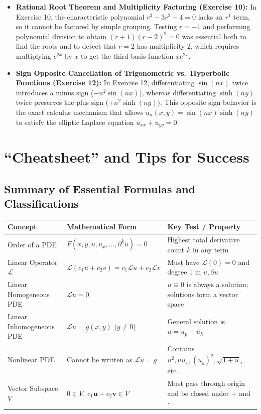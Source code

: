 \documentclass[11pt,a4paper]{article}
\begin{document}
\begin{itemize}
    \item \textbf{Rational Root Theorem and Multiplicity Factoring (Exercise 10):}
    In Exercise 10, the characteristic polynomial $r^3 - 3r^2 + 4 = 0$ lacks an $r^1$ term, so it cannot be factored by simple grouping. Testing $r = -1$ and performing polynomial division to obtain $(r+1)(r-2)^2 = 0$ was essential both to find the roots and to detect that $r = 2$ has multiplicity $2$, which requires multiplying $e^{2x}$ by $x$ to get the third basis function $x e^{2x}$.
    \item \textbf{Sign Opposite Cancellation of Trigonometric vs.\ Hyperbolic Functions (Exercise 12):}
    In Exercise 12, differentiating $\sin(nx)$ twice introduces a minus sign ($-n^2\sin(nx)$), whereas differentiating $\sinh(ny)$ twice preserves the plus sign ($+n^2\sinh(ny)$). This opposite sign behavior is the exact calculus mechanism that allows $u_n(x, y) = \sin(nx)\sinh(ny)$ to satisfy the elliptic Laplace equation $u_{xx} + u_{yy} = 0$.
\end{itemize}

\newpage
\section{``Cheatsheet'' and Tips for Success}

\subsection{Summary of Essential Formulas and Classifications}
\begin{center}
\renewcommand{\arraystretch}{1.4}
\begin{tabular}{@{}lll@{}}
\toprule
\textbf{Concept} & \textbf{Mathematical Form} & \textbf{Key Test / Property} \\ \midrule
Order of a PDE & $F(x, y, u, u_x, \dots, \partial^k u) = 0$ & Highest total derivative count $k$ in any term \\
Linear Operator $\mathcal{L}$ & $\mathcal{L}(c_1 u + c_2 v) = c_1\mathcal{L}u + c_2\mathcal{L}v$ & Must have $\mathcal{L}(0) = 0$ and degree $1$ in $u, \partial u$ \\
Linear Homogeneous PDE & $\mathcal{L}u = 0$ & $u \equiv 0$ is always a solution; solutions form a vector space \\
Linear Inhomogeneous PDE & $\mathcal{L}u = g(x, y)$ ($g \neq 0$) & General solution is $u = u_p + u_h$ \\
Nonlinear PDE & Cannot be written as $\mathcal{L}u = g$ & Contains $u^2, u u_x, (u_y)^2, \sqrt{1+u}$, etc. \\
Vector Subspace $V$ & $0 \in V$, $c_1\mathbf{u} + c_2\mathbf{v} \in V$ & Must pass through origin and be closed under $+$ and $\cdot$ \\ \bottomrule
\end{tabular}
\end{center}
\end{document}
